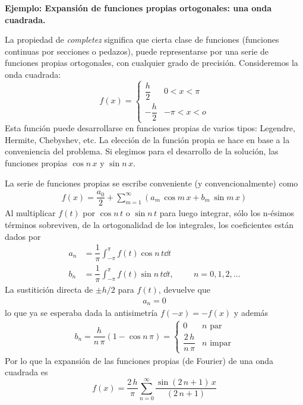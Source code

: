 \textbf{Ejemplo: Expansión de funciones propias ortogonales: una onda cuadrada.}
\par
La propiedad de \emph{completez} significa que cierta clase de funciones (funciones continuas por secciones o pedazos), puede representarse por una serie de funciones propias ortogonales, con cualquier grado de precisión. Consideremos la onda cuadrada:
\begin{equation}
f(x) = \begin{cases}
\dfrac{h}{2} & 0 < x < \pi \\[0.5em]
- \dfrac{h}{2} & -\pi < x < o
\end{cases}
\label{eq_ecuacion_10_37}
\end{equation}
Esta función puede desarrollarse en funciones propias de varios tipos: Legendre, Hermite, Chebyshev, etc. La elección de la función propia se hace en base a la conveniencia del problema. Si elegimos para el desarrollo de la solución, las funciones propias $\cos n \, x$ y $\sin n \, x$.
\par
La serie de funciones propias se escribe conveniente (y convencionalmente) como
\begin{align*}
f(x) = \dfrac{a_{0}}{2} + \sum_{m=1}^{\infty} (a_{m} \, \cos m \, x +  b_{m} \, \sin m \, x)
\end{align*}
Al multiplicar $f(t)$ por $\cos n \, t$ o $\sin n \, t$ para luego integrar, sólo los n-ésimos términos sobreviven, de la ortogonalidad de los integrales, los coeficientes están dados por
\begin{align*}
a_{n} &= \dfrac{1}{\pi} \int_{-\pi}^{\pi} f(t) \cos n \, t \dd{t} \\[1em]
b_{n} &= \dfrac{1}{\pi} \int_{-\pi}^{\pi} f(t) \sin n \, t \dd{t}, \hspace{1cm} n = 0,1,2,\ldots
\end{align*}
La sustitición directa de $\pm h/2$ para $f(t)$, devuelve que
\begin{align*}
 a_{n} = 0
\end{align*}
lo que ya se esperaba dada la antisimetría $f(-x) = - f(x)$ y además
\begin{align*}
b_{n} = \dfrac{h}{n \, \pi} (1 - \cos n \, \pi) = \begin{cases}
0 & n \mbox{ par} \\
\dfrac{2 \, h}{n \, \pi} & n \mbox{ impar} \end{cases}
\end{align*}
Por lo que la expansión de las funciones propias (de Fourier) de una onda cuadrada es
\begin{equation}
f(x) = \dfrac{2 \, h}{\pi} \sum_{n=0}^{\infty} \dfrac{\sin(2 \, n + 1) \, x}{(2 \, n + 1)}
\label{eq:ecuacion_10_38}
\end{equation}
